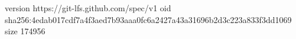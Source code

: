 version https://git-lfs.github.com/spec/v1
oid sha256:4edab017cdf7a4f3aed7b93aaa0fc6a2427a43a31696b2d3c223a833f3dd1069
size 174956

